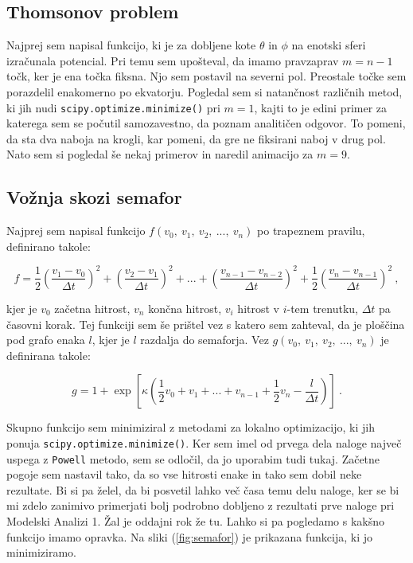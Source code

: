 \documentclass[a4paper]{article}
\begin{document}
\subsection{Thomsonov problem}
Najprej sem napisal funkcijo, ki je za dobljene kote $\theta$ in $\phi$ na enotski sferi izračunala
potencial. Pri temu sem upošteval, da imamo pravzaprav $m = n - 1$ točk, ker je ena točka fiksna. Njo
sem postavil na severni pol. Preostale točke sem porazdelil enakomerno po ekvatorju. Pogledal sem si
natančnost različnih metod, ki jih nudi \texttt{scipy.optimize.minimize()} pri $m=1$, kajti to je edini
primer za katerega sem se počutil samozavestno, da poznam analitičen odgovor. To pomeni, da sta dva naboja 
na krogli, kar pomeni, da gre ne fiksirani naboj v drug pol. Nato sem si pogledal še nekaj primerov 
in naredil animacijo za $m=9$. \\

\subsection{Vožnja skozi semafor}
Najprej sem napisal funkcijo $f(v_0,\>v_1,\>v_2,\>...,\>v_n)$ po trapeznem pravilu, definirano takole:

\begin{equation}
        f =
        \frac{1}{2} \left(\frac{v_1 - v_0}{\Delta t}\right)^2 + \left(\frac{v_2 - v_1}{\Delta t}\right)^2
        + ... + \left(\frac{v_{n-1} - v_{n-2}}{\Delta t}\right)^2 + \frac{1}{2} \left(\frac{v_n - v_{n-1}}{\Delta t}\right)^2\>,    
\end{equation}

kjer je $v_0$ začetna hitrost, $v_n$ končna hitrost, $v_i$ hitrost v $i$-tem trenutku, $\Delta t$ pa časovni korak.
Tej funkciji sem še prištel vez s katero sem zahteval, da je ploščina pod grafo enaka $l$, kjer je $l$ razdalja 
do semaforja. Vez $g(v_0,\>v_1,\>v_2,\>...,\>v_n)$ je definirana takole:

\begin{equation}
    g = 1 + \exp\left[\kappa\left(\frac{1}{2}v_0 + v_1 + ... + v_{n-1} + \frac{1}{2}v_n - 
    \frac{l}{\Delta t}\right)\right]\>.
\end{equation}

Skupno funkcijo sem minimiziral z metodami za lokalno optimizacijo, ki jih ponuja \texttt{scipy.optimize.minimize()}.
Ker sem imel od prvega dela naloge največ uspega z \texttt{Powell} metodo, sem se odločil, da jo uporabim tudi tukaj.
Začetne pogoje sem nastavil tako, da so vse hitrosti enake in tako sem dobil neke rezultate. Bi si pa želel, da bi 
posvetil lahko več časa temu delu naloge, ker se bi mi zdelo zanimivo primerjati bolj podrobno dobljeno z rezultati
prve naloge pri Modelski Analizi 1. Žal je oddajni rok že tu. Lahko si pa pogledamo s kakšno funkcijo imamo opravka.
Na sliki (\ref{fig:semafor}) je prikazana funkcija, ki jo minimiziramo. \\
\end{document}
